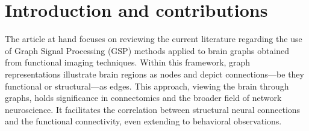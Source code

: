 \documentclass[11pt]{article}
\begin{document}

\section{Introduction and contributions}


The article at hand focuses on reviewing the current literature regarding the use of Graph Signal Processing (GSP) methods applied to brain graphs obtained from functional imaging techniques. Within this framework, graph representations illustrate brain regions as nodes and depict connections—be they functional or structural—as edges. This approach, viewing the brain through graphs, holds significance in connectomics and the broader field of network neuroscience. It facilitates the correlation between structural neural connections and the functional connectivity, even extending to behavioral observations.
\end{document}
